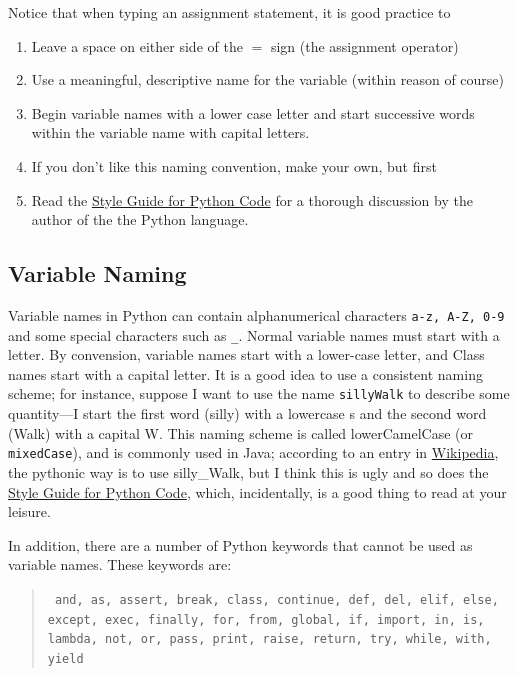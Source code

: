 Notice that when typing an assignment statement, it is good practice to 
\begin{enumerate}
\item Leave a space on either side of the $=$ sign (the assignment operator)
\item Use a meaningful, descriptive name for the variable (within reason of course)
\item Begin variable names with a lower case letter and start successive words within the variable name with capital letters.
\item If you don't like this naming convention, make your own, but first
\item Read the \href{http://www.python.org/dev/peps/pep-0008/#a-foolish-consistency-is-the-hobgoblin-of-little-minds}{Style Guide for Python Code} for a thorough discussion by the author of the the Python language.
\end{enumerate}

\subsection{Variable Naming}
\label{sec:variableNaming}

Variable names in Python can contain alphanumerical characters \texttt{a-z, A-Z, 0-9} and some special characters such as \texttt{\_}. Normal variable names must start with a letter. By convension, variable names start with a lower-case letter, and Class names start with a capital letter. It is a good idea to use a consistent naming scheme; for instance, suppose I want to use the name \texttt{sillyWalk} to describe some quantity---I start the first word (silly) with a lowercase s and the second word (Walk) with a capital W. This naming scheme is called lowerCamelCase (or \texttt{mixedCase}), and is commonly used in Java; according to an entry in \href{http://en.wikipedia.org/wiki/Naming_convention_(programming)}{Wikipedia}, the pythonic way is to use silly\_Walk, but I think this is ugly and so does the \href{http://www.python.org/dev/peps/pep-0008/}{Style Guide for Python Code}, which, incidentally, is a good thing to read at your leisure. 

In addition, there are a number of Python keywords that cannot be used as variable names. These keywords are:
\begin{quotation} \texttt{\noindent 
and, as, assert, break, class, continue, def, del, elif, else,
except, exec, finally, for, from, global, if, import, in, is, 
lambda, not, or, pass, print, raise, return, try, while, with, yield
}
\end{quotation}

